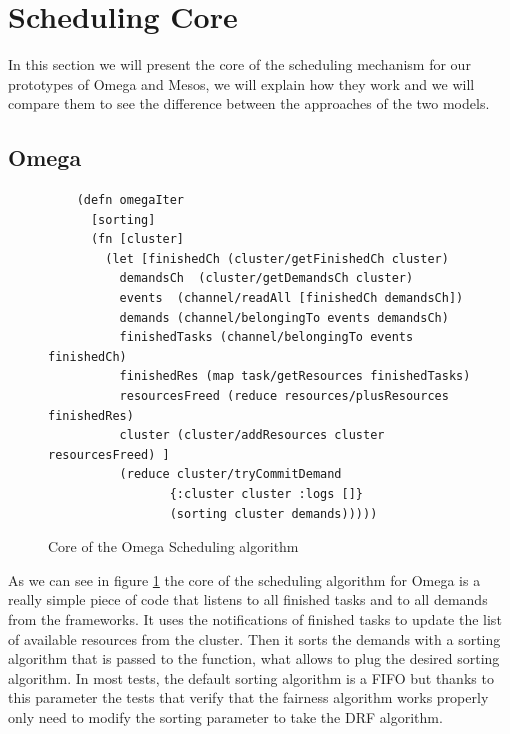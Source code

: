\documentclass{report}                     %
\begin{document}
\section{Scheduling Core}

In this section we will present the core of the scheduling mechanism
for our prototypes of Omega and Mesos, we will explain how they work
and we will compare them to see the difference between the approaches
of the two models.

\subsection{Omega}

\begin{figure}[!ht]
\centering
\begin{verbatim}
    (defn omegaIter
      [sorting]
      (fn [cluster]
        (let [finishedCh (cluster/getFinishedCh cluster)
          demandsCh  (cluster/getDemandsCh cluster)
          events  (channel/readAll [finishedCh demandsCh])
          demands (channel/belongingTo events demandsCh)
          finishedTasks (channel/belongingTo events finishedCh)
          finishedRes (map task/getResources finishedTasks)
          resourcesFreed (reduce resources/plusResources finishedRes)
          cluster (cluster/addResources cluster resourcesFreed) ]
          (reduce cluster/tryCommitDemand
                 {:cluster cluster :logs []}
                 (sorting cluster demands)))))

\end{verbatim}
\caption{Core of the Omega Scheduling algorithm}
\label{fig:omega-implementation}
\end{figure}

As we can see in figure \ref{fig:omega-implementation} the core of the
scheduling algorithm for Omega is a really simple piece of code that
listens to all finished tasks and to all demands from the
frameworks. It uses the notifications of finished tasks to update the 
list of available resources from the cluster. Then it sorts the
demands with a sorting algorithm that is passed to the function, what
allows to plug the desired sorting algorithm. In most tests, the
default sorting algorithm is a FIFO but thanks to this parameter the
tests that verify that the fairness algorithm works properly only need
to modify the sorting parameter to take the DRF algorithm.
\end{document}
